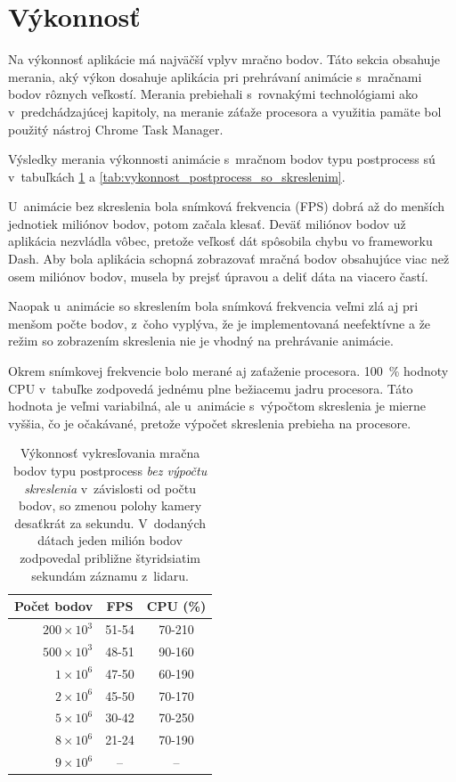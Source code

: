\section{Výkonnosť}

Na výkonnosť aplikácie má najväčší vplyv mračno bodov. Táto sekcia obsahuje merania, aký výkon dosahuje aplikácia pri prehrávaní animácie s~mračnami bodov rôznych veľkostí. Merania prebiehali s~rovnakými technológiami ako v~predchádzajúcej kapitoly, na meranie záťaže procesora a využitia pamäte bol použitý nástroj Chrome Task Manager.

Výsledky merania výkonnosti animácie s~mračnom bodov typu postprocess sú v~tabuľkách \ref{tab:vykonnost_postprocess} a \ref{tab:vykonnost_postprocess_so_skreslenim}. 

U~animácie bez skreslenia bola snímková frekvencia (FPS) dobrá až do menších jednotiek miliónov bodov, potom začala klesať. Deväť miliónov bodov už aplikácia nezvládla vôbec, pretože veľkosť dát spôsobila chybu vo frameworku Dash. Aby bola aplikácia schopná zobrazovať mračná bodov obsahujúce viac než osem miliónov bodov, musela by prejsť úpravou a deliť dáta na viacero častí. 

Naopak u~animácie so skreslením bola snímková frekvencia veľmi zlá aj pri menšom počte bodov, z~čoho vyplýva, že je implementovaná neefektívne a že režim so zobrazením skreslenia nie je vhodný na prehrávanie animácie.

Okrem snímkovej frekvencie bolo merané aj zaťaženie procesora. 100~\% hodnoty CPU v~tabuľke zodpovedá jednému plne bežiacemu jadru procesora. Táto hodnota je veľmi variabilná, ale u~animácie s~výpočtom skreslenia je mierne vyššia, čo je očakávané, pretože výpočet skreslenia prebieha na procesore.

\begin{table}[t]
    \centering
    \begin{tabular}{r||c|c}
        Počet bodov & FPS & CPU (\%) \\ \hline
        $200\times10^3$ & 51-54 & 70-210 \\
        $500\times10^3$ & 48-51 & 90-160 \\
        $1\times10^6$ & 47-50 & 60-190 \\
        $2\times10^6$ & 45-50 & 70-170 \\
        $5\times10^6$ & 30-42 & 70-250 \\
        $8\times10^6$ & 21-24 & 70-190 \\
        $9\times10^6$ & -- & -- \\
    \end{tabular}
    \caption{Výkonnosť vykresľovania mračna bodov typu postprocess \emph{bez výpočtu skreslenia} v~závislosti od počtu bodov, so zmenou polohy kamery desaťkrát za sekundu. V~dodaných dátach jeden milión bodov zodpovedal približne štyridsiatim sekundám záznamu z~lidaru.}
    \label{tab:vykonnost_postprocess}
\end{table}

